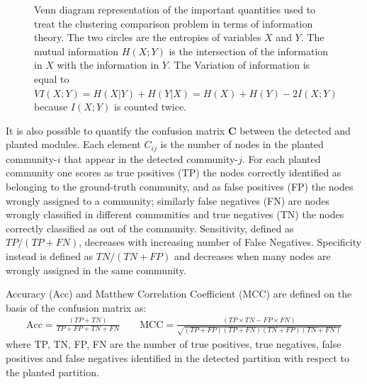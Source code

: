 \begin{figure}[htb!]
\centering
{}
\caption{Venn diagram representation of the important quantities used to treat the clustering comparison problem in terms of information theory.
The two circles are the entropies of variables $X$ and $Y$.
The mutual information $H(X;Y)$ is the intersection of the information in $X$ with the information in $Y$.
The Variation of information is equal to $VI(X;Y)=H(X|Y)+H(Y|X)=H(X)+H(Y)-2I(X;Y)$ because $I(X;Y)$ is counted twice.}
\label{fig:venn_diagram}
\end{figure}


It is also possible to quantify the confusion matrix $\mathbf{C}$ between the detected and planted modules.
Each element $C_{ij}$ is the number of nodes in the planted community-$i$ that appear in the detected community-$j$.
For each planted community one scores as true positives (TP) the nodes correctly identified as belonging to the ground-truth community, and as false positives (FP) the nodes wrongly assigned to a community; similarly false negatives (FN) are nodes wrongly classified in different communities and true negatives (TN) the nodes correctly classified as out of the community. Sensitivity, defined as $TP/(TP+FN)$, decreases with increasing number of False Negatives. Specificity instead is defined as $TN/(TN+FP)$ and decreases when many nodes are wrongly assigned in the same community. 

Accuracy (Acc) and Matthew Correlation Coefficient (MCC) are defined on the basis of the confusion matrix as:
\begin{align*}
\textrm{Acc}=\frac{(TP+TN)}{TP+FP+TN+FN} \qquad \textrm{MCC}=\frac{(TP\times TN-FP\times FN)}{\sqrt{(TP+FP)(TP+FN)(TN+FP)(TN+FN)}}
\end{align*}
where TP, TN, FP, FN are the number of true positives, true negatives, false positives and false negatives identified in the detected partition with respect to the planted partition.

